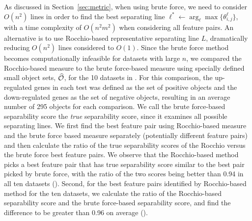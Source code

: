 

 As discussed in Section~\ref{sec:metric}, when using brute force, we need to consider $O(n^2)$ lines in order to find the best separating line $\ell^* \leftarrow \arg_\ell \max \{\theta_{i,j}^{\ell}\}$, with a time complexity of $O(n^2m^2)$ when considering all feature pairs. An alternative is to use Rocchio-based representative separating line $L$, dramatically reducing $O(n^2)$ lines considered to $O(1)$. Since the brute force method becomes computationally infeasible for datasets with large $n$, we compared the Rocchio-based measure to the brute force-based measure using
specially defined small object sets, $\widehat{{\mathcal{O}}}$, for the 10 datasets in \msig. For this comparison, the up-regulated genes in each \msig test was defined as the set of positive objects and the down-regulated genes as the set of negative objects, resulting in an average number of 295 objects for each comparison. We call the brute force-based separability score the {\em true} separability score, since it examines all possible separating lines. We first find the best feature pair using Rocchio-based measure and the brute force based measure separately (potentially different feature pairs) and then calculate the ratio of the true separability scores of the Rocchio versus the brute force best feature pairs. We observe that the Rocchio-based method picks a best feature pair that has true separability score similar to the best pair picked by brute force, with the ratio of the two scores being better than 0.94 in all ten datasets (\bruterocchioratio). Second, for the best feature pairs identified by Rocchio-based method for the ten datasets, we calculate the ratio of the Rocchio-based separability score and the brute force-based separability score, and find the difference to be greater than 0.96 on average (\bruterocchioscore).

